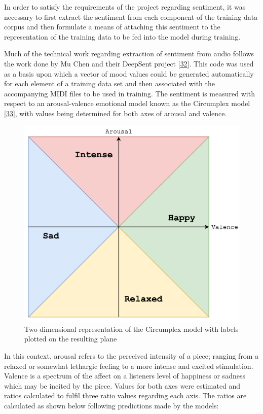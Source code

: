 \documentclass[12pt,]{article}
\begin{document}
In order to satisfy the requirements of the project regarding sentiment,
it was necessary to first extract the sentiment from each component of
the training data corpus and then formulate a means of attaching this
sentiment to the representation of the training data to be fed into the
model during training.

Much of the technical work regarding extraction of sentiment from audio
follows the work done by Mu Chen and their DeepSent project
{[}\protect\hyperlink{ref-deepsent}{32}{]}. This code was used as a
basis upon which a vector of mood values could be generated
automatically for each element of a training data set and then
associated with the accompanying MIDI files to be used in training. The
sentiment is measured with respect to an arousal-valence emotional model
known as the Circumplex model
{[}\protect\hyperlink{ref-russell1980circumplex}{33}{]}, with values
being determined for both axes of arousal and valence.

\begin{figure}
\centering
\includegraphics{Images/circumplex.png}
\caption{Two dimensional representation of the Circumplex model with
labels plotted on the resulting plane}
\end{figure}

In this context, arousal refers to the perceived intensity of a piece;
ranging from a relaxed or somewhat lethargic feeling to a more intense
and excited stimulation. Valence is a spectrum of the affect on a
listeners level of happiness or sadness which may be incited by the
piece. Values for both axes were estimated and ratios calculated to
fulfil three ratio values regarding each axis. The ratios are calculated
as shown below following predictions made by the models:
\end{document}
